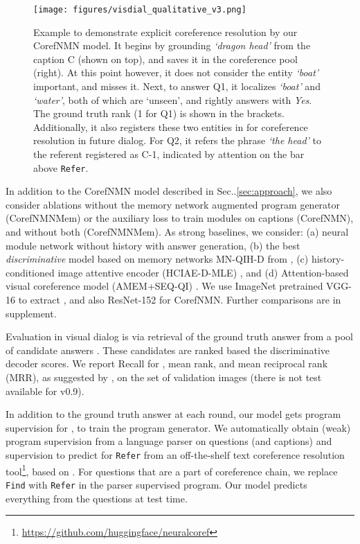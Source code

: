 \documentclass[runningheads]{llncs}
\makeatletter
\DeclareRobustCommand\onedot{\futurelet\@let@token\@onedot}
\def\@onedot{\ifx\@let@token.\else.\null\fi\xspace}
\def\Sec{Sec\onedot}
\newcommand{\nmn}{CorefNMN\xspace}
\newcommand{\myparagraph}[1]{\vspace{0pt}\noindent{\bf #1}}
\makeatother
\begin{document}
\begin{figure}[t]
	\centering
    \texttt{[image: figures/visdial\_qualitative\_v3.png]}
    \caption{
    Example to demonstrate explicit coreference resolution by our \nmn model.
    It begins by grounding \textit{`dragon head'} from the caption C
    (shown on top), and saves it in the coreference pool  (right).
    At this point however, it does not consider the entity \textit{`boat'} 
    important, and misses it.
    Next, to answer Q1, it localizes \textit{`boat'} and \textit{`water'},
    both of which are `unseen', and rightly answers with \textit{Yes}.
    The ground truth rank (1 for Q1) is shown in the brackets.
    Additionally, it also registers these two entities in  for 
    coreference resolution in future dialog.
    For Q2, it refers the phrase \textit{`the head'} to the referent registered
    as C-1, indicated by attention on the bar above \texttt{Refer}.}
    \label{fig:visdial_qualitative}
\end{figure} 

\myparagraph{Models and baselines.}
In addition to the \nmn model described in \Sec\ref{sec:approach}, 
we also consider ablations without the memory network augmented
program generator (\nmn{}Mem) or the auxiliary loss 
 to train modules on captions 
(\nmn{}), and without both
(\nmn{}Mem).
As strong baselines, we consider: 
(a) neural module network without history \cite{hu2017learning} with answer
generation,
(b) the best \textit{discriminative} model based on memory networks MN-QIH-D 
from \cite{visdial}, (c) history-conditioned image attentive encoder (HCIAE-D-MLE) \cite{lu2017best},
and
(d) Attention-based visual coreference model (AMEM+SEQ-QI) \cite{paul2017visual}.
We use ImageNet pretrained VGG-16 \cite{simonyan_iclr15} to extract ,
and also ResNet-152 \cite{he16cvpr} for \nmn{}.
Further comparisons are in supplement.

\myparagraph{Evaluation.}
Evaluation in visual dialog is via retrieval of the ground truth answer 
 from a pool of  candidate answers 
.
These candidates are ranked based the discriminative decoder scores.
We report Recall for , mean rank, and mean reciprocal rank 
(MRR), as suggested by \cite{visdial},
on the set of  validation images (there is not test available for v0.9).

\myparagraph{Supervision.}
In addition to the ground truth answer  at each round, our model 
gets program supervision for , to train the program generator.
We automatically obtain (weak) program supervision from a language parser on 
questions (and captions) \cite{hu16cvpr} and supervision to predict for \texttt{Refer} from an off-the-shelf text coreference resolution
tool\footnote{\url{https://github.com/huggingface/neuralcoref}}, based on
\cite{clark16emnlp}.
For questions that are a part of coreference chain, we replace \texttt{Find}
 with \texttt{Refer} in the parser supervised program. Our model predicts everything from the questions at test time. 
\end{document}
